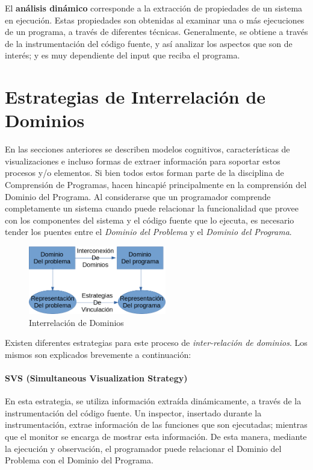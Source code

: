 El \textbf{análisis dinámico} corresponde a la extracción de propiedades de un sistema
en ejecución.
Estas propiedades son obtenidas al examinar una o más ejecuciones de un programa, a
través de diferentes técnicas.
Generalmente, se obtiene a través de la instrumentación del código fuente, y así
analizar los aspectos que son de interés; y es muy dependiente del input que reciba
el programa.
\cite{Ball99}

\section{Estrategias de Interrelación de Dominios}

En las secciones anteriores se describen modelos cognitivos, características de
visualizaciones e incluso formas de extraer información para soportar estos 
procesos y/o elementos.
Si bien todos estos forman parte de la disciplina de Comprensión de Programas, hacen
hincapié principalmente en la comprensión del Dominio del Programa.
Al considerarse que un programador comprende completamente un sistema cuando puede
relacionar la funcionalidad que provee con los componentes del sistema y el código
fuente que lo ejecuta, es necesario tender los puentes entre el \textit{Dominio del Problema}
y el \textit{Dominio del Programa}.

\begin{figure}[H]
    \includegraphics[width=6cm]{program_comprehension/domains.png}
    \centering
    \caption{Interrelación de Dominios}
\end{figure}

Existen diferentes estrategias\cite{BeronOliveiraCruz10} para este proceso de 
\textit{inter-relación de dominios}.
Los mismos son explicados brevemente a continuación:

\paragraph{SVS (Simultaneous Visualization Strategy)}
En esta estrategia, se utiliza información extraída dinámicamente, a través de
la instrumentación del código fuente.
Un inspector, insertado durante la instrumentación, extrae información de las funciones 
que son ejecutadas; mientras que el monitor se encarga de mostrar esta información.
De esta manera, mediante la ejecución y observación, el programador puede relacionar
el Dominio del Problema con el Dominio del Programa. 

